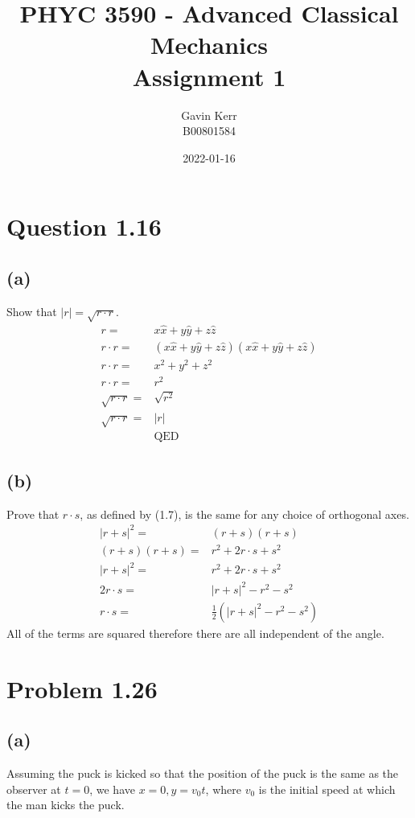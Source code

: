\documentclass[12pt, a4paper]{article}
\title{PHYC 3590 - Advanced Classical Mechanics\\Assignment 1}
\author{Gavin Kerr\\B00801584}
\date{2022-01-16}
\begin{document}
\maketitle

\section*{Question 1.16}
\subsection*{(a)}
Show that $|r| = \sqrt{r\cdot r}$. 
\begin{align*}
r =& x\hat{x} + y \hat{y} + z \hat{z}
\\
r\cdot r =& (x\hat{x} + y \hat{y} + z \hat{z})(x\hat{x} + y \hat{y} + z \hat{z})
\\
r\cdot r =& x^2 + y^2 + z^2 
\\
r\cdot r =& r^2
\\
\sqrt{r\cdot r} =& \sqrt{r^2}
\\
\sqrt{r\cdot r} =& |r|
\\
&\text{QED}
\end{align*}
\subsection*{(b)}
Prove that $r\cdot s$, as defined by (1.7), is the same for any choice of orthogonal axes. 
\begin{align*}
|r+s|^2 =& (r+s)(r+s) 
\\
(r+s)(r+s) =& r^2 + 2r\cdot s + s^2
\\
|r+s|^2 =& r^2 + 2r\cdot s + s^2
\\
2r\cdot s =& |r+s|^2 - r^2 - s^2
\\
r\cdot s =& \tfrac{1}{2}(|r+s|^2 - r^2 - s^2)
\end{align*}
All of the terms are squared therefore there are all independent of the angle. 





\section*{Problem 1.26}
\subsection*{(a)}
Assuming the puck is kicked so that the position of the puck is the same as the observer at $t=0$, we have $x=0, y=v_0t$, where $v_0$ is the initial speed at which the man kicks the puck.
\end{document}
